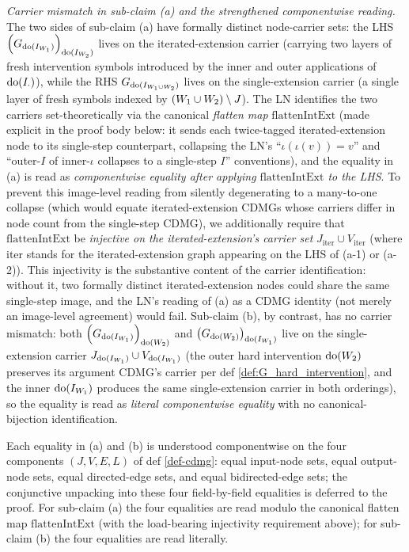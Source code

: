 \documentclass[main]{subfiles}
\providecommand{\flattenIntExt}{\mathrm{flattenIntExt}}
\begin{document}
\begin{Lem}
    \emph{Carrier mismatch in sub-claim (a) and the strengthened componentwise reading.}
    The two sides of sub-claim (a) have formally distinct node-carrier sets: the LHS $\left ( G_{\operatorname{do}(I_{W_1})} \right )_{\operatorname{do}(I_{W_2})}$ lives on the iterated-extension carrier (carrying two layers of fresh intervention symbols introduced by the inner and outer applications of $\operatorname{do}(I_\cdot)$), while the RHS $G_{\operatorname{do}(I_{W_1 \cup W_2})}$ lives on the single-extension carrier (a single layer of fresh symbols indexed by $(W_1 \cup W_2) \setminus J$). The LN identifies the two carriers set-theoretically via the canonical \emph{flatten map} $\flattenIntExt$ (made explicit in the proof body below: it sends each twice-tagged iterated-extension node to its single-step counterpart, collapsing the LN's ``$\iota(\iota(v)) = v$'' and ``outer-$I$ of inner-$\iota$ collapses to a single-step $I$'' conventions), and the equality in (a) is read as \emph{componentwise equality after applying $\flattenIntExt$ to the LHS}. To prevent this image-level reading from silently degenerating to a many-to-one collapse (which would equate iterated-extension CDMGs whose carriers differ in node count from the single-step CDMG), we additionally require that $\flattenIntExt$ be \emph{injective on the iterated-extension's carrier set} $J_{\mathrm{iter}} \cup V_{\mathrm{iter}}$ (where $\mathrm{iter}$ stands for the iterated-extension graph appearing on the LHS of (a-1) or (a-2)). This injectivity is the substantive content of the carrier identification: without it, two formally distinct iterated-extension nodes could share the same single-step image, and the LN's reading of (a) as a CDMG identity (not merely an image-level agreement) would fail. Sub-claim (b), by contrast, has no carrier mismatch: both $\left ( G_{\operatorname{do}(I_{W_1})} \right )_{\operatorname{do}(W_2)}$ and $\left ( G_{\operatorname{do}(W_2)} \right )_{\operatorname{do}(I_{W_1})}$ live on the single-extension carrier $J_{\operatorname{do}(I_{W_1})} \cup V_{\operatorname{do}(I_{W_1})}$ (the outer hard intervention $\operatorname{do}(W_2)$ preserves its argument CDMG's carrier per def \ref{def:G_hard_intervention}, and the inner $\operatorname{do}(I_{W_1})$ produces the same single-extension carrier in both orderings), so the equality is read as \emph{literal componentwise equality} with no canonical-bijection identification.

    Each equality in (a) and (b) is understood componentwise on the four components $(J, V, E, L)$ of def \ref{def-cdmg}: equal input-node sets, equal output-node sets, equal directed-edge sets, and equal bidirected-edge sets; the conjunctive unpacking into these four field-by-field equalities is deferred to the proof. For sub-claim (a) the four equalities are read modulo the canonical flatten map $\flattenIntExt$ (with the load-bearing injectivity requirement above); for sub-claim (b) the four equalities are read literally.
\end{Lem}
\end{document}
